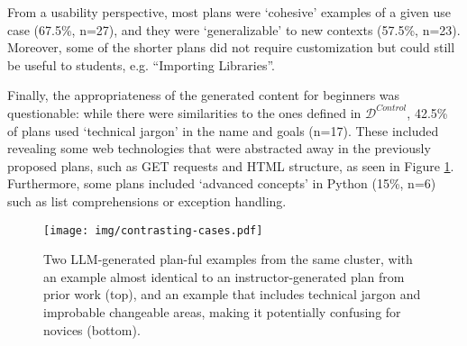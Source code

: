 From a usability perspective, most plans were `cohesive' examples of a given use case (67.5\%, n=27), and they were `generalizable' to new contexts (57.5\%, n=23). Moreover, some of the shorter plans did not require customization but could still be useful to students, e.g. ``Importing Libraries''.

Finally, the appropriateness of the generated content for beginners was questionable: while there were similarities to the ones defined in \(\mathcal{D}^{\textit{Control}}\), 42.5\% of plans used `technical jargon' in the name and goals (n=17). These included revealing some web technologies that were abstracted away in the previously proposed plans, such as GET requests and HTML structure, as seen in Figure \ref{fig:contrasting-cases}. Furthermore, some plans included `advanced concepts' in Python (15\%, n=6) such as list comprehensions or exception handling. 

\begin{figure}
    \centering
    \texttt{[image: img/contrasting-cases.pdf]}
    \caption{Two LLM-generated plan-ful examples from the same cluster, with an example almost identical to an instructor-generated plan from prior work (top), and an example that includes technical jargon and improbable changeable areas, making it potentially confusing for novices (bottom).}
    \label{fig:contrasting-cases}
\end{figure}
















